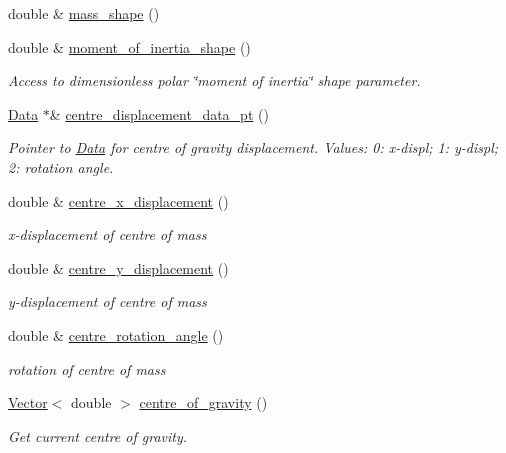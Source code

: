 \begin{DoxyCompactItemize}
double \& \hyperlink{classoomph_1_1ImmersedRigidBodyElement_a0ff9948b9df503ec15a32d3f6f19784e}{mass\+\_\+shape} ()
\item 
double \& \hyperlink{classoomph_1_1ImmersedRigidBodyElement_ac55d720f7151e838785bcca455127155}{moment\+\_\+of\+\_\+inertia\+\_\+shape} ()
\begin{DoxyCompactList}\small\item\em Access to dimensionless polar \char`\"{}moment of inertia\char`\"{} shape parameter. \end{DoxyCompactList}\item 
\hyperlink{classoomph_1_1Data}{Data} $\ast$\& \hyperlink{classoomph_1_1ImmersedRigidBodyElement_ac1e912d596869720566ab2264aa60d6c}{centre\+\_\+displacement\+\_\+data\+\_\+pt} ()
\begin{DoxyCompactList}\small\item\em Pointer to \hyperlink{classoomph_1_1Data}{Data} for centre of gravity displacement. Values\+: 0\+: x-\/displ; 1\+: y-\/displ; 2\+: rotation angle. \end{DoxyCompactList}\item 
double \& \hyperlink{classoomph_1_1ImmersedRigidBodyElement_ad8dd9dad803362a51742fc9e79aa6aa7}{centre\+\_\+x\+\_\+displacement} ()
\begin{DoxyCompactList}\small\item\em x-\/displacement of centre of mass \end{DoxyCompactList}\item 
double \& \hyperlink{classoomph_1_1ImmersedRigidBodyElement_a61ffdb07b3db3936f83c3abef3d322d7}{centre\+\_\+y\+\_\+displacement} ()
\begin{DoxyCompactList}\small\item\em y-\/displacement of centre of mass \end{DoxyCompactList}\item 
double \& \hyperlink{classoomph_1_1ImmersedRigidBodyElement_aca1ade4ee20982d2f91c10d3730c0f00}{centre\+\_\+rotation\+\_\+angle} ()
\begin{DoxyCompactList}\small\item\em rotation of centre of mass \end{DoxyCompactList}\item 
\hyperlink{classoomph_1_1Vector}{Vector}$<$ double $>$ \hyperlink{classoomph_1_1ImmersedRigidBodyElement_a087cd76b208e47bb4b29a63f01d2b6f7}{centre\+\_\+of\+\_\+gravity} ()
\begin{DoxyCompactList}\small\item\em Get current centre of gravity. \end{DoxyCompactList}\item 

\end{DoxyCompactItemize}
